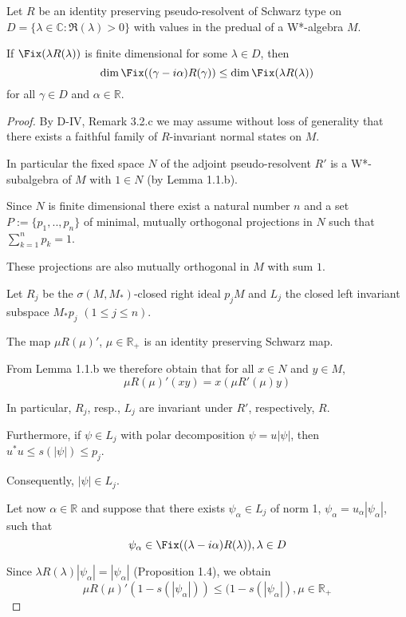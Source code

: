 \begin{proposition}\label{prop:d3-2-1}
Let $R$ be an identity preserving pseudo-resolvent of Schwarz type on $D = \{\lambda \in \mathbb{C} : \Re(\lambda) > 0\}$ with values in the predual of a W*-algebra $M$.

If $\Fix(\lambda R(\lambda))$ is finite dimensional for some $\lambda \in D$, then
\[
\dim \Fix((\gamma - i\alpha)R(\gamma)) \leq \dim \Fix(\lambda R(\lambda))
\]
for all $\gamma \in D$ and $\alpha \in \mathbb{R}$.
\end{proposition}

\begin{proof}
By D-IV, Remark 3.2.c we may assume without loss of generality that there exists a faithful family of $R$-invariant normal states on $M$.

In particular the fixed space $N$ of the adjoint pseudo-resolvent $R'$ is a W*-subalgebra of $M$ with $1 \in N$ (by Lemma 1.1.b).

Since $N$ is finite dimensional there exist a natural number $n$ and a set $P := \{p_{1}, .., p_{n}\}$ of minimal, mutually orthogonal projections in $N$ such that $\sum_{k=1}^{n} p_{k} = 1$.

These projections are also mutually orthogonal in $M$ with sum $1$.

Let $R_{j}$ be the $\sigma(M,M_{*})$-closed right ideal $p_{j}M$ and $L_{j}$ the closed left invariant subspace $M_{*}p_{j}$ $(1 \leq j \leq n)$.

The map $\mu R(\mu)'$, $\mu \in \mathbb{R}_{+}$ is an identity preserving Schwarz map.

From Lemma 1.1.b we therefore obtain that for all $x \in N$ and $y \in M$,
\[
\mu R(\mu)'(xy) = x(\mu R'(\mu)y)
\]

In particular, $R_{j}$, resp., $L_{j}$ are invariant under $R'$, respectively, $R$.

Furthermore, if $\psi \in L_{j}$ with polar decomposition $\psi = u|\psi|$, then $u^{*}u \leq s(|\psi|) \leq p_{j}$.

Consequently, $|\psi| \in L_{j}$.

Let now $\alpha \in \mathbb{R}$ and suppose that there exists $\psi_{\alpha} \in L_{j}$ of norm 1, $\psi_{\alpha} = u_{\alpha}|\psi_{\alpha}|$, such that
\[
\psi_{\alpha} \in \Fix((\lambda - i\alpha)R(\lambda)) , \lambda \in D
\]

Since $\lambda R(\lambda)|\psi_{\alpha}| = |\psi_{\alpha}|$ (Proposition 1.4), we obtain
\[
\mu R(\mu)'(1-s(|\psi_{\alpha}|)) \leq (1-s(|\psi_{\alpha}|) , \mu \in \mathbb{R}_{+}
\]


\end{proof}
